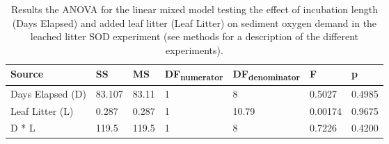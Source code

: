 \begin{table}
\begin{tabular}{ l l l l l l l }

Source           & SS      & MS     & DF\textsubscript{numerator} & DF\textsubscript{denominator} & F       & p  \\
\hline
Days Elapsed (D) & 83.107  & 83.11  & 1                           & 8                             & 0.5027  & 0.4985 \\
Leaf Litter (L)  & 0.287   & 0.287  & 1                           & 10.79                         & 0.00174 & 0.9675 \\
D * L            & 119.5   & 119.5  & 1                           & 8                            & 0.7226  & 0.4200 \\

\end{tabular}
\caption{\label{tab:leached_SOD_ANOVA} Results the ANOVA for the linear mixed model testing the effect of incubation length (Days Elapsed) and added leaf litter (Leaf Litter) on sediment oxygen demand in the leached litter SOD experiment (see methods for a description of the different experiments).}
\end{table}